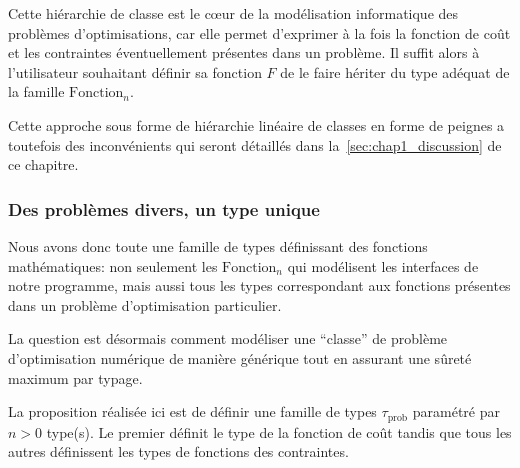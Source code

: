Cette hiérarchie de classe est le c\oe ur de la modélisation
informatique des problèmes d'optimisations, car elle permet d'exprimer
à la fois la fonction de coût et les contraintes éventuellement
présentes dans un problème. Il suffit alors à l'utilisateur souhaitant
définir sa fonction $F$ de le faire hériter du type adéquat de la
famille $\text{Fonction}_n$.

Cette approche sous forme de hiérarchie linéaire de classes en forme
de peignes a toutefois des inconvénients qui seront détaillés dans
la \autoref{sec:chap1_discussion} de ce chapitre.


\subsubsection{Des problèmes divers, un type unique}
\label{sec:chap1_model2impl_typage_info_prob}


Nous avons donc toute une famille de types définissant des fonctions
mathématiques: non seulement les $\text{Fonction}_n$ qui modélisent
les interfaces de notre programme, mais aussi tous les types
correspondant aux fonctions présentes dans un problème d'optimisation
particulier.

La question est désormais comment modéliser une ``classe'' de problème
d'optimisation numérique de manière générique tout en assurant une
sûreté maximum par typage.

La proposition réalisée ici est de définir une famille de types
$\tau_{\text{prob}}$ paramétré par $n > 0$ type(s). Le premier définit
le type de la fonction de coût tandis que tous les autres définissent
les types de fonctions des contraintes.


